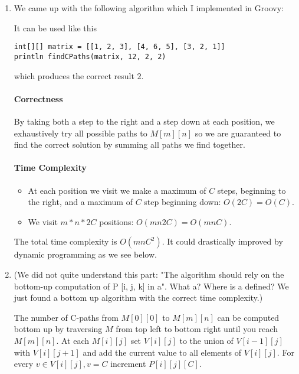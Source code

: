 \documentclass[12pt, a4paper]{article}
\begin{document}
\section{} %
\begin{enumerate}[a]
	\item %
	We came up with the following algorithm which I implemented in Groovy:

	

	It can be used like this

	\begin{lstlisting}
int[][] matrix = [[1, 2, 3], [4, 6, 5], [3, 2, 1]]
println findCPaths(matrix, 12, 2, 2)
	\end{lstlisting}

	which produces the correct result $2$.

	\paragraph{Correctness}

	By taking both a step to the right and a step down at each position, we exhaustively try all possible paths to $M[m][n]$ so we are guaranteed to find the correct solution by summing all paths we find together.

	\paragraph{Time Complexity}

	\begin{itemize}
		\item At each position we visit we make a maximum of $C$ steps, beginning to the right, and a maximum of $C$ step beginning down: $O(2C) = O(C)$.
		\item We visit $m * n * 2C$ positions: $O(mn2C) = O(mnC)$.
	\end{itemize}

	The total time complexity is $O(mnC^2)$. It could drastically improved by dynamic programming as we see below.

	\item %
	(We did not quite understand this part: "The algorithm should rely on the bottom-up computation of P [i, j, k] in a". What a? Where is a defined? We just found a bottom up algorithm with the correct time complexity.)

	The number of C-paths from $M[0][0]$ to $M[m][n]$ can be computed bottom up by traversing $M$ from top left to bottom right until you reach $M[m][n]$. At each $M[i][j]$ set $V[i][j]$ to the union of $V[i - 1][j]$ with $V[i][j + 1]$ and add the current value to all elements of $V[i][j]$. For every $v \in V[i][j], v = C$ increment $P[i][j][C]$.


\end{enumerate}
\end{document}
